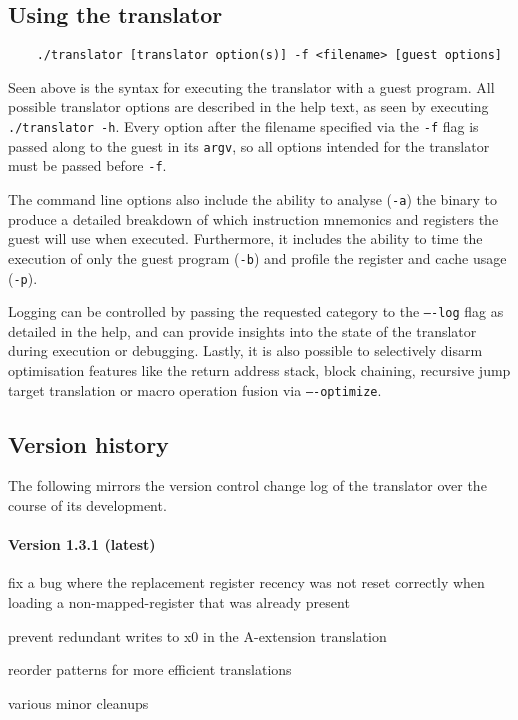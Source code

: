 \subsection{Using the translator}
\label{sec:translator-usage}
\begin{lstlisting}
	./translator [translator option(s)] -f <filename> [guest options]
\end{lstlisting}

Seen above is the syntax for executing the translator with a guest program.
All possible translator options are described in the help text, as seen by executing \texttt{./translator -h}.
Every option after the filename specified via the \texttt{-f} flag is passed along to the guest in its \texttt{argv}, so all options intended for the translator must be passed before \texttt{-f}.

The command line options also include the ability to analyse (\texttt{-a}) the binary to produce a detailed breakdown of which instruction mnemonics and registers the guest will use when executed.
Furthermore, it includes the ability to time the execution of only the guest program (\texttt{-b}) and profile the register and cache usage (\texttt{-p}).

Logging can be controlled by passing the requested category to the \texttt{----log} flag as detailed in the help, and can provide insights into the state of the translator during execution or debugging.
Lastly, it is also possible to selectively disarm optimisation features like the return address stack, block chaining, recursive jump target translation or macro operation fusion via \texttt{----optimize}.


\subsection{Version history}
The following mirrors the version control change log of the translator over the course of its development.

\paragraph{Version 1.3.1 (latest)}
\begin{itemize*}
 	\item fix a bug where the replacement register recency was not reset correctly when loading a non-mapped-register that was already present
 	\item prevent redundant writes to x0 in the A-extension translation
 	\item reorder patterns for more efficient translations
 	\item various minor cleanups
\end{itemize*}


